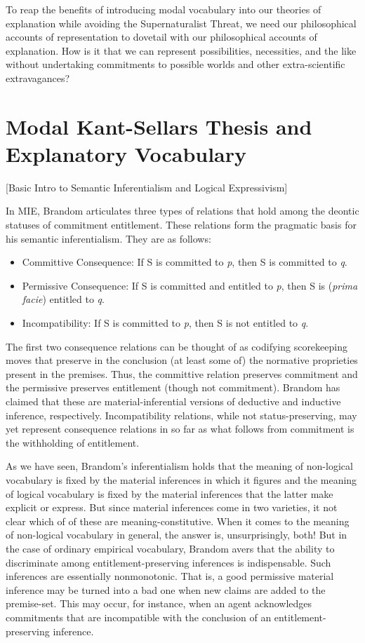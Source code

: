 \documentclass{article}
\begin{document}
To reap the benefits of introducing modal vocabulary into our theories of explanation while avoiding the Supernaturalist Threat, we need our philosophical accounts of representation to dovetail with our philosophical accounts of explanation. How is it that we can represent possibilities, necessities, and the like without undertaking commitments to possible worlds and other extra-scientific extravagances?



\newpage
\section{Modal Kant-Sellars Thesis and Explanatory Vocabulary}

 [Basic Intro to Semantic Inferentialism and Logical Expressivism]

In MIE, Brandom articulates three types of relations that hold among the deontic statuses of commitment entitlement. These relations form the pragmatic basis for his semantic inferentialism. They are as follows:

\begin{itemize}
	\item{Committive Consequence}: If S is committed to \textit{p}, then S is committed to \textit{q}.
	\item{Permissive Consequence}: If S is committed and entitled to \textit{p}, then S is (\emph{prima facie}) entitled to \textit{q}.
	\item{Incompatibility}: If S is committed to \textit{p}, then S is not entitled to \textit{q}.
\end{itemize}


The first two consequence relations can be thought of as codifying scorekeeping moves that preserve in the conclusion (at least some of) the normative proprieties present in the premises. Thus, the committive relation preserves commitment and the permissive preserves entitlement (though not commitment). Brandom has claimed that these are material-inferential versions of deductive and inductive inference, respectively. Incompatibility relations, while not status-preserving, may yet represent consequence relations in so far as what follows from commitment is the withholding of entitlement. 

As we have seen, Brandom's inferentialism holds that the meaning of non-logical vocabulary is fixed by the material inferences in which it figures and the meaning of logical vocabulary is fixed by the material inferences that the latter make explicit or express. But since material inferences come in two varieties, it not clear which of of these are meaning-constitutive. When it comes to the meaning of non-logical vocabulary in general, the answer is, unsurprisingly, both! But in the case of ordinary empirical vocabulary, Brandom avers that the ability to discriminate among entitlement-preserving inferences is indispensable. Such inferences are essentially nonmonotonic. That is, a good permissive material inference may be turned into a bad one when new claims are added to the premise-set. This may occur, for instance, when an agent acknowledges commitments that are incompatible with the conclusion of an entitlement-preserving inference.
\end{document}
